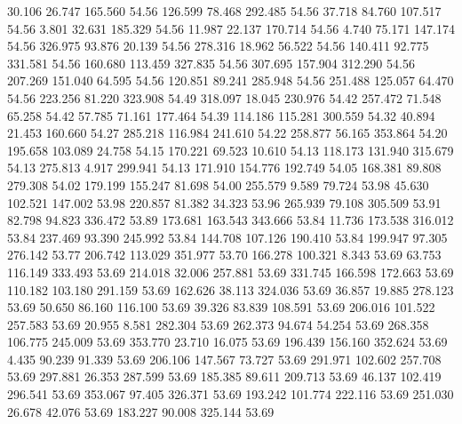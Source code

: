  30.106   26.747  165.560        54.56
 126.599   78.468  292.485        54.56
  37.718   84.760  107.517        54.56
   3.801   32.631  185.329        54.56
  11.987   22.137  170.714        54.56
   4.740   75.171  147.174        54.56
 326.975   93.876   20.139        54.56
 278.316   18.962   56.522        54.56
 140.411   92.775  331.581        54.56
 160.680  113.459  327.835        54.56
 307.695  157.904  312.290        54.56
 207.269  151.040   64.595        54.56
 120.851   89.241  285.948        54.56
 251.488  125.057   64.470        54.56
 223.256   81.220  323.908        54.49
 318.097   18.045  230.976        54.42
 257.472   71.548   65.258        54.42
  57.785   71.161  177.464        54.39
 114.186  115.281  300.559        54.32
  40.894   21.453  160.660        54.27
 285.218  116.984  241.610        54.22
 258.877   56.165  353.864        54.20
 195.658  103.089   24.758        54.15
 170.221   69.523   10.610        54.13
 118.173  131.940  315.679        54.13
 275.813    4.917  299.941        54.13
 171.910  154.776  192.749        54.05
 168.381   89.808  279.308        54.02
 179.199  155.247   81.698        54.00
 255.579    9.589   79.724        53.98
  45.630  102.521  147.002        53.98
 220.857   81.382   34.323        53.96
 265.939   79.108  305.509        53.91
  82.798   94.823  336.472        53.89
 173.681  163.543  343.666        53.84
  11.736  173.538  316.012        53.84
 237.469   93.390  245.992        53.84
 144.708  107.126  190.410        53.84
 199.947   97.305  276.142        53.77
 206.742  113.029  351.977        53.70
 166.278  100.321    8.343        53.69
  63.753  116.149  333.493        53.69
 214.018   32.006  257.881        53.69
 331.745  166.598  172.663        53.69
 110.182  103.180  291.159        53.69
 162.626   38.113  324.036        53.69
  36.857   19.885  278.123        53.69
  50.650   86.160  116.100        53.69
  39.326   83.839  108.591        53.69
 206.016  101.522  257.583        53.69
  20.955    8.581  282.304        53.69
 262.373   94.674   54.254        53.69
 268.358  106.775  245.009        53.69
 353.770   23.710   16.075        53.69
 196.439  156.160  352.624        53.69
   4.435   90.239   91.339        53.69
 206.106  147.567   73.727        53.69
 291.971  102.602  257.708        53.69
 297.881   26.353  287.599        53.69
 185.385   89.611  209.713        53.69
  46.137  102.419  296.541        53.69
 353.067   97.405  326.371        53.69
 193.242  101.774  222.116        53.69
 251.030   26.678   42.076        53.69
 183.227   90.008  325.144        53.69
